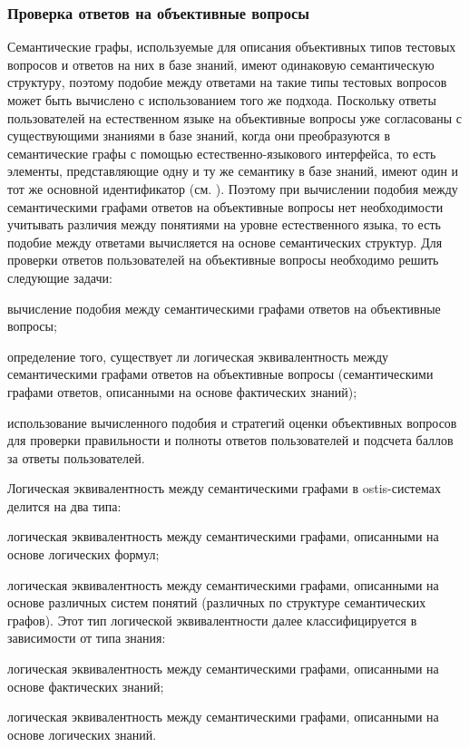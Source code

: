 \subsubsection{Проверка ответов на объективные вопросы}

Семантические графы, используемые для описания объективных типов тестовых вопросов и ответов на них в базе знаний, имеют одинаковую семантическую структуру, поэтому подобие между ответами на такие типы тестовых вопросов может быть вычислено с использованием того же подхода. Поскольку ответы пользователей на естественном языке на объективные вопросы уже согласованы с существующими знаниями в базе знаний, когда они преобразуются в семантические графы с помощью естественно-языкового интерфейса, то есть элементы, представляющие одну и ту же семантику в базе знаний, имеют один и тот же основной идентификатор (см. ). Поэтому при вычислении подобия между семантическими графами ответов на объективные вопросы нет необходимости учитывать различия между понятиями на уровне естественного языка, то есть подобие между ответами вычисляется на основе семантических структур. Для проверки ответов пользователей на объективные вопросы необходимо решить следующие задачи:

\begin{textitemize}
	\item вычисление подобия между семантическими графами ответов на объективные вопросы;
	\item определение того, существует ли логическая эквивалентность между семантическими графами ответов на объективные вопросы (семантическими графами ответов, описанными на основе фактических знаний);
	\item использование вычисленного подобия и стратегий оценки объективных вопросов для проверки правильности и полноты ответов пользователей и подсчета баллов за ответы пользователей.
\end{textitemize}

Логическая эквивалентность между семантическими графами в ostis-системах делится на два типа:

\begin{textitemize}
	\item логическая эквивалентность между семантическими графами, описанными на основе логических формул;
	\item логическая эквивалентность между семантическими графами, описанными на основе различных систем понятий (различных по структуре семантических графов). Этот тип логической эквивалентности далее классифицируется в зависимости от типа знания:
	
	\begin{textitemize}
		\item логическая эквивалентность между семантическими графами, описанными на основе фактических знаний;
		\item логическая эквивалентность между семантическими графами, описанными на основе логических знаний.
	\end{textitemize}
	
\end{textitemize}

